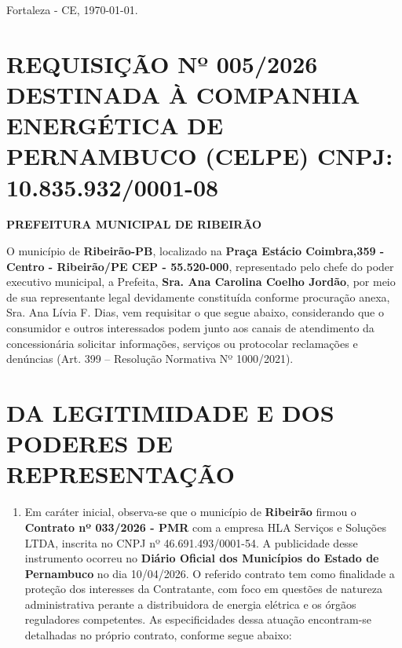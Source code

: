 \documentclass[11pt,a4paper]{article}
\begin{document}
\begin{flushright}
Fortaleza - CE, \today.
\end{flushright}

\section{REQUISIÇÃO Nº 005/2026 DESTINADA À COMPANHIA ENERGÉTICA DE PERNAMBUCO (CELPE) CNPJ: 10.835.932/0001-08}
\vspace{-0.4cm}
\textbf{PREFEITURA MUNICIPAL DE RIBEIRÃO}

\vspace{0.5cm}

O município de \textbf{Ribeirão-PB}, localizado na \textbf{Praça Estácio Coimbra,359 - Centro - Ribeirão/PE CEP - 55.520-000}, representado pelo chefe do poder executivo municipal, a Prefeita, \textbf{Sra. Ana Carolina Coelho Jordão}, por meio de sua representante legal devidamente constituída conforme procuração anexa, Sra. Ana Lívia F. Dias, vem requisitar o que segue abaixo, considerando que o consumidor e outros interessados podem junto aos canais de atendimento da concessionária solicitar informações, serviços ou protocolar reclamações e denúncias (Art. 399 -- Resolução Normativa Nº 1000/2021).

\section{DA LEGITIMIDADE E DOS PODERES DE REPRESENTAÇÃO}

\begin{enumerate}
\item
  Em caráter inicial, observa-se que o município de \textbf{Ribeirão} firmou o \textbf{Contrato nº 033/2026 - PMR} com a empresa HLA Serviços e Soluções LTDA, inscrita no CNPJ nº 46.691.493/0001-54. A publicidade desse instrumento ocorreu no \textbf{Diário Oficial dos Municípios do Estado de Pernambuco} no dia 10/04/2026. O referido contrato tem como finalidade a proteção dos interesses da Contratante, com foco em questões de natureza administrativa perante a distribuidora de energia elétrica e os órgãos reguladores competentes. As especificidades dessa atuação encontram-se detalhadas no próprio contrato, conforme segue abaixo:
\end{enumerate}
\end{document}
